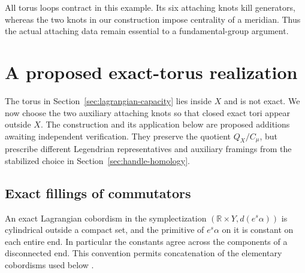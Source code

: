 \documentclass[11pt]{amsart}
\theoremstyle{definition}
\theoremstyle{remark}
\begin{document}
All torus loops contract in this example. Its six attaching knots
kill generators, whereas the two knots in our construction impose
centrality of a meridian. Thus the actual attaching data remain
essential to a fundamental-group argument.

\section{A proposed exact-torus realization}\label{sec:exact-tori}

The torus in Section~\ref{sec:lagrangian-capacity} lies inside $X$
and is not exact. We now choose the two auxiliary attaching knots
so that closed exact tori appear outside $X$. The construction and
its application below are proposed additions awaiting independent
verification. They preserve the quotient $Q_X/C_\mu$, but prescribe
different Legendrian representatives and auxiliary framings from the
stabilized choice in Section~\ref{sec:handle-homology}.

\subsection{Exact fillings of commutators}

An exact Lagrangian cobordism in the symplectization
$(\mathbb R\times Y,d(e^s\alpha))$ is cylindrical outside a compact
set, and the primitive of $e^s\alpha$ on it is constant on each
entire end. In particular the constants agree across the components
of a disconnected end. This convention permits concatenation of
the elementary cobordisms used below \cite[Definition 2.1]{SVW24}.
\end{document}

